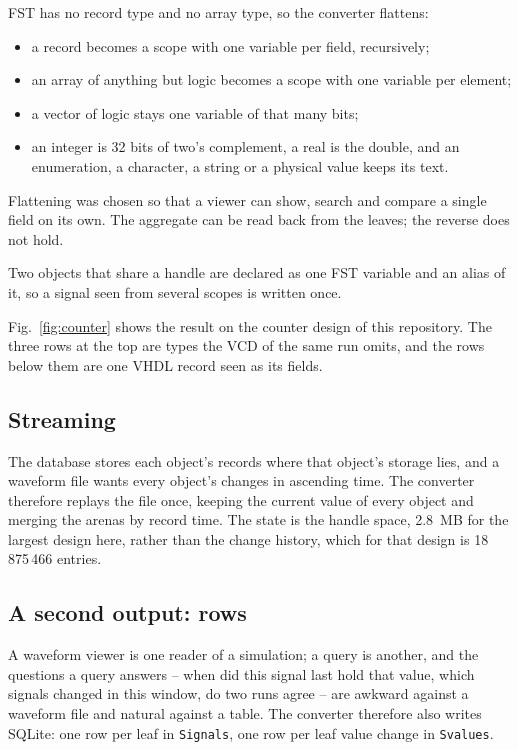 FST has no record type and no array type, so the converter flattens:

\begin{itemize}
  \item a record becomes a scope with one variable per field,
        recursively;
  \item an array of anything but logic becomes a scope with one
        variable per element;
  \item a vector of logic stays one variable of that many bits;
  \item an integer is 32 bits of two's complement, a real is the
        double, and an enumeration, a character, a string or a
        physical value keeps its text.
\end{itemize}

Flattening was chosen so that a viewer can show, search and compare a
single field on its own. The aggregate can be read back from the
leaves; the reverse does not hold.

Two objects that share a handle are declared as one FST variable and
an alias of it, so a signal seen from several scopes is written once.

Fig.~\ref{fig:counter} shows the result on the counter design of this
repository. The three rows at the top are types the VCD of the same
run omits, and the rows below them are one VHDL record seen as its
fields.

\subsection{Streaming}

The database stores each object's records where that object's storage
lies, and a waveform file wants every object's changes in ascending
time. The converter therefore replays the file once, keeping the
current value of every object and merging the arenas by record time.
The state is the handle space, 2.8~MB for the largest design here,
rather than the change history, which for that design is
18\,875\,466 entries.

\subsection{A second output: rows}

A waveform viewer is one reader of a simulation; a query is another,
and the questions a query answers -- when did this signal last hold
that value, which signals changed in this window, do two runs agree --
are awkward against a waveform file and natural against a table. The
converter therefore also writes SQLite: one row per leaf in
\texttt{Signals}, one row per leaf value change in \texttt{Svalues}.


